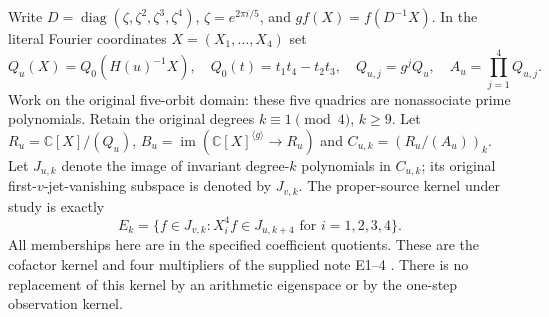 \documentclass[11pt]{article}
\newcommand{\C}{\mathbb C}
\newcommand{\im}{\operatorname{im}}
\newcommand{\diag}{\operatorname{diag}}
\begin{document}
Write $D=\diag(\zeta,\zeta^2,\zeta^3,\zeta^4)$,
$\zeta=e^{2\pi i/5}$, and $g f(X)=f(D^{-1}X)$. In the literal
Fourier coordinates $X=(X_1,\ldots,X_4)$ set
\[
 Q_u(X)=Q_0(H(u)^{-1}X),\quad Q_0(t)=t_1t_4-t_2t_3,
 \quad Q_{u,j}=g^jQ_u,\quad A_u=\prod_{j=1}^4Q_{u,j}.
 \tag{NC5}
\]
Work on the original five-orbit domain: these five quadrics are
nonassociate prime polynomials. Retain the original degrees
$k\equiv1\pmod4$, $k\ge9$. Let $R_u=\C[X]/(Q_u)$,
$B_u=\im(\C[X]^{\langle g\rangle}\to R_u)$ and
$C_{u,k}=(R_u/(A_u))_k$. Let $J_{u,k}$ denote the image of invariant
degree-$k$ polynomials in $C_{u,k}$; its original first-$v$-jet-vanishing
subspace is denoted by $J_{v,k}$. The proper-source kernel under study is
exactly
\[
 E_k=\{f\in J_{v,k}: X_i^4 f\in J_{u,k+4}
                 \text{ for }i=1,2,3,4\}. \tag{NC6}
\]
All memberships here are in the specified coefficient quotients. These
are the cofactor kernel and four multipliers of the supplied note E1--4
\cite{Native}. There is no replacement of this kernel by an arithmetic
eigenspace or by the one-step observation kernel.
\end{document}
